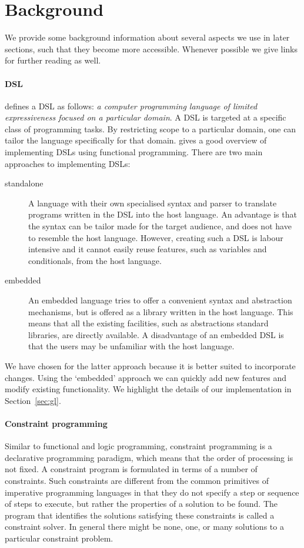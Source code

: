 \section{Background}
\label{sec:background}

We provide some background information about several aspects we use in
later sections, such that they become more accessible.
%
Whenever possible we give links for further reading as well.

\paragraph{\acl{DSL}} \citet{fowler} defines a \ac{DSL} as follows:
%
\emph{a computer programming language of limited expressiveness
  focused on a particular domain}.
%
A \ac{DSL} is targeted at a specific class of programming tasks.
%
By restricting scope to a particular domain, one can tailor the
language specifically for that domain.
%
\citet{Gibbons2015} gives a good overview of implementing \acp{DSL}
using functional programming.
%
There are two main approaches to implementing \acp{DSL}:
\begin{description}
\item[standalone] A language with their own specialised syntax and
  parser to translate programs written in the \ac{DSL} into the host
  language.
%
  An advantage is that the syntax can be tailor made for the target
  audience, and does not have to resemble the host language.
%
  However, creating such a \ac{DSL} is labour intensive and it cannot
  easily reuse features, such as variables and conditionals, from the
  host language.
\item[embedded] An embedded language tries to offer a convenient
  syntax and abstraction mechanisms, but is offered as a library
  written in the host language.
%
  This means that all the existing facilities, such as abstractions
  standard libraries, are directly available.
%
  A disadvantage of an embedded \ac{DSL} is that the users may be
  unfamiliar with the host language.
\end{description}
%
We have chosen for the latter approach because it is better suited
to incorporate changes. Using the `embedded' approach we can quickly
add new features and modify existing functionality. We highlight the 
details of our implementation in Section~\ref{sec:gl}.

\paragraph{Constraint programming} Similar to functional and logic
programming, constraint programming is a declarative programming
paradigm, which means that the order of processing is not fixed.
%
A constraint program is formulated in terms of a number of
constraints.
%
Such constraints are different from the common primitives of
imperative programming languages in that they do not specify a step or
sequence of steps to execute, but rather the properties of a solution
to be found.
%
The program that identifies the solutions satisfying these constraints
is called a constraint solver.
%
In general there might be none, one, or many solutions to a particular
constraint problem.


